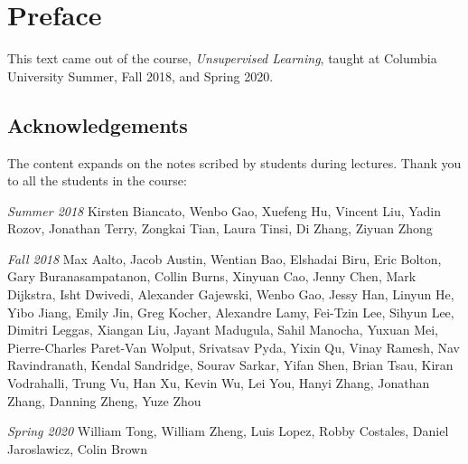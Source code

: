 \chapter*{Preface}

This text came out of the course, \textit{Unsupervised Learning},
taught at Columbia University Summer, Fall 2018, and Spring 2020.

\section*{Acknowledgements} The content expands on the notes scribed
by students during lectures. Thank you to all the students in the
course:

\textit{Summer 2018} Kirsten Biancato, Wenbo Gao, Xuefeng Hu,
Vincent Liu, Yadin Rozov, Jonathan Terry, Zongkai Tian, Laura Tinsi,
Di Zhang, Ziyuan Zhong

\textit{Fall 2018} Max Aalto, Jacob Austin, Wentian Bao, Elshadai
Biru, Eric Bolton, Gary Buranasampatanon, Collin Burns, Xinyuan Cao,
Jenny Chen, Mark Dijkstra, Isht Dwivedi, Alexander Gajewski, Wenbo
Gao, Jessy Han, Linyun He, Yibo Jiang, Emily Jin, Greg Kocher,
Alexandre Lamy, Fei-Tzin Lee, Sihyun Lee, Dimitri Leggas, Xiangan Liu,
Jayant Madugula, Sahil Manocha, Yuxuan Mei, Pierre-Charles Paret-Van
Wolput, Srivatsav Pyda, Yixin Qu, Vinay Ramesh, Nav Ravindranath,
Kendal Sandridge, Sourav Sarkar, Yifan Shen, Brian Tsau, Kiran
Vodrahalli, Trung Vu, Han Xu, Kevin Wu, Lei You, Hanyi Zhang, Jonathan
Zhang, Danning Zheng, Yuze Zhou

\textit{Spring 2020} William Tong, William Zheng, Luis Lopez, Robby
Costales, Daniel Jaroslawicz, Colin Brown
